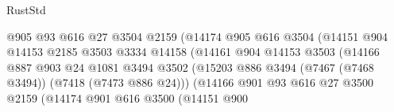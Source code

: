\begin{lexlean}{RustStd}
\begin{coremodule}
                                            @905
                                            @93
                                            @616
                                            @27
                                            @3504
                                            @2159
                                            (@14174
                                              @905
                                              @616
                                              @3504
                                              (@14151
                                                @904
                                                @14153
                                                @2185
                                                @3503
                                                @3334
                                                @14158
                                                (@14161
                                                  @904
                                                  @14153
                                                  @3503
                                                  (@14166
                                                    @887
                                                    @903
                                                    @24
                                                    @1081
                                                    @3494
                                                    @3502
                                                    (@15203
                                                      @886
                                                      @3494
                                                      (@7467 (@7468 @3494))
                                                      (@7418 (@7473 @886 @24)))
                                                    (@14166
                                                      @901
                                                      @93
                                                      @616
                                                      @27
                                                      @3500
                                                      @2159
                                                      (@14174
                                                        @901
                                                        @616
                                                        @3500
                                                        (@14151
                                                          @900

\end{coremodule}
\end{lexlean}
